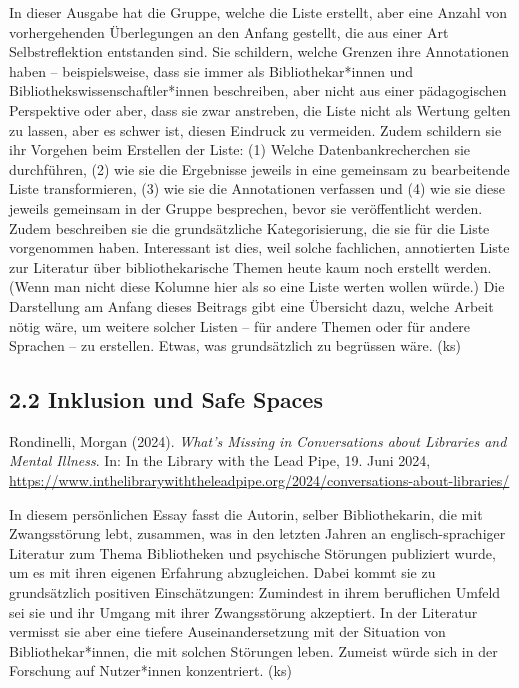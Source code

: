 \documentclass[a4paper,
fontsize=11pt,
oneside,
numbers=noperiodatend,
parskip=half-,
bibliography=totoc,
final
]{scrartcl}
\begin{document}
In dieser Ausgabe hat die Gruppe, welche die Liste erstellt, aber eine
Anzahl von vorhergehenden Überlegungen an den Anfang gestellt, die aus
einer Art Selbstreflektion entstanden sind. Sie schildern, welche
Grenzen ihre Annotationen haben – beispielsweise, dass sie immer als
Bibliothekar*innen und Bibliothekswissenschaftler*innen beschreiben,
aber nicht aus einer pädagogischen Perspektive oder aber, dass sie zwar
anstreben, die Liste nicht als Wertung gelten zu lassen, aber es schwer
ist, diesen Eindruck zu vermeiden. Zudem schildern sie ihr Vorgehen beim
Erstellen der Liste: (1) Welche Datenbankrecherchen sie durchführen, (2)
wie sie die Ergebnisse jeweils in eine gemeinsam zu bearbeitende Liste
transformieren, (3) wie sie die Annotationen verfassen und (4) wie sie
diese jeweils gemeinsam in der Gruppe besprechen, bevor sie
veröffentlicht werden. Zudem beschreiben sie die grundsätzliche
Kategorisierung, die sie für die Liste vorgenommen haben. Interessant
ist dies, weil solche fachlichen, annotierten Liste zur Literatur über
bibliothekarische Themen heute kaum noch erstellt werden. (Wenn man
nicht diese Kolumne hier als so eine Liste werten wollen würde.) Die
Darstellung am Anfang dieses Beitrags gibt eine Übersicht dazu, welche
Arbeit nötig wäre, um weitere solcher Listen – für andere Themen oder
für andere Sprachen – zu erstellen. Etwas, was grundsätzlich zu
begrüssen wäre. (ks)

\hypertarget{inklusion-und-safe-spaces}{%
\subsection{2.2 Inklusion und Safe
Spaces}\label{inklusion-und-safe-spaces}}

Rondinelli, Morgan (2024). \emph{What's Missing in Conversations about
Libraries and Mental Illness}. In: In the Library with the Lead Pipe,
19. Juni 2024,
\url{https://www.inthelibrarywiththeleadpipe.org/2024/conversations-about-libraries/}

In diesem persönlichen Essay fasst die Autorin, selber Bibliothekarin,
die mit Zwangsstörung lebt, zusammen, was in den letzten Jahren an
englisch-sprachiger Literatur zum Thema Bibliotheken und psychische
Störungen publiziert wurde, um es mit ihren eigenen Erfahrung
abzugleichen. Dabei kommt sie zu grundsätzlich positiven Einschätzungen:
Zumindest in ihrem beruflichen Umfeld sei sie und ihr Umgang mit ihrer
Zwangsstörung akzeptiert. In der Literatur vermisst sie aber eine
tiefere Auseinandersetzung mit der Situation von Bibliothekar*innen, die
mit solchen Störungen leben. Zumeist würde sich in der Forschung auf
Nutzer*innen konzentriert. (ks)
\end{document}
